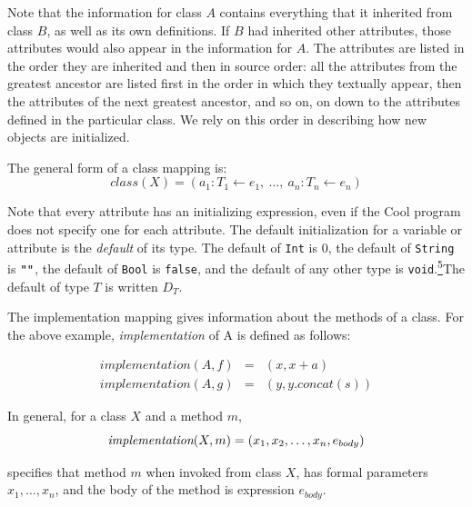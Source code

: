 \documentclass[]{article}
\begin{document}
Note that the information for class $A$ contains everything that it
inherited from class $B$, as well as its own definitions. If $B$ had
inherited other attributes, those attributes would also appear in the
information for $A$. The attributes are listed in the order they are
inherited and then in source order: all the attributes from the greatest
ancestor are listed first in the order in which they textually appear,
then the attributes of the next greatest ancestor, and so on, on down to
the attributes defined in the particular class. We rely on this order in
describing how new objects are initialized.

The general form of a class mapping is: \\

\begin{displaymath}
class(X) = (a_1:T_1\leftarrow e_1,\ \ldots,\ a_n:T_n\leftarrow e_n)
\end{displaymath}

Note that every attribute has an initializing expression, even if the
Cool program does not specify one for each attribute. The default
initialization for a variable or attribute is the \emph{default} of its
type. The default of \texttt{Int} is 0, the default of \texttt{String}
is $\mbox {\tt ''}\mbox {\tt ''}$, the default of \texttt{Bool} is
\texttt{false}, and the default of any other type is
\texttt{void}.\href{footnode.html\#foot1803}{\textsuperscript{5}}The
default of type $ T$ is written $D_T$.

The implementation mapping gives information about the methods of a
class. For the above example, \emph{implementation} of A is defined as
follows:

\begin{displaymath}
\begin{array}{rcl}
implementation(A,f) & = & (x, x+a) \\
implementation(A,g) & = & (y, y.concat(s))
\end{array}\end{displaymath}

In general, for a class $X$ and a method $m$, \\

\begin{displaymath}
\mbox{\em implementation}(X,m) = (x_1, x_2, \ldots, x_n, e_{body})
\end{displaymath}

specifies that method $m$ when invoked from class $X$, has formal
parameters $x_1, \ldots, x_n$, and the body of the method is expression
$e_{body}$.
\end{document}
